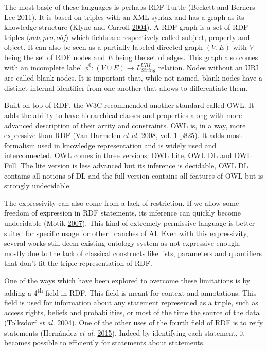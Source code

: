 \documentclass[11pt,a4paper,twoside,openright,titlepage,numbers=noenddot,headinclude,cleardoublepage=empty,openany]{scrreprt}
\theoremstyle{plain}
\theoremstyle{definition}
\theoremstyle{remark}
\begin{document}
The most basic of these languages is perhaps RDF Turtle (Beckett and
Berners-Lee \protect\hyperlink{ref-beckett_turtle_2011}{2011}). It is
based on triples with an XML syntax and has a graph as its knowledge
structure (Klyne and Carroll
\protect\hyperlink{ref-klyne_resource_2004}{2004}). A RDF graph is a set
of RDF triples \(\langle sub, pro, obj \rangle\) which fields are
respectively called subject, property and object. It can also be seen as
a partially labeled directed graph \((V, E)\) with \(V\) being the set
of RDF nodes and \(E\) being the set of edges. This graph also comes
with an incomplete label \(\phi^0 : (V \cup E) \to L_{String}^{URI}\)
relation. Nodes without an URI are called blank nodes. It is important
that, while not named, blank nodes have a distinct internal identifier
from one another that allows to differentiate them.

Built on top of RDF, the W3C recommended another standard called OWL. It
adds the ability to have hierarchical classes and properties along with
more advanced description of their arrity and constraints. OWL is, in a
way, more expressive than RDF (Van Harmelen \emph{et al.}
\protect\hyperlink{ref-vanharmelen_handbook_2008}{2008}, vol. 1 p825).
It adds most formalism used in knowledge representation and is widely
used and interconnected. OWL comes in three versions: OWL Lite, OWL DL
and OWL Full. The lite version is less advanced but its inference is
decidable, OWL DL contains all notions of DL and the full version
contains all features of OWL but is strongly undecidable.

The expressivity can also come from a lack of restriction. If we allow
some freedom of expression in RDF statements, its inference can quickly
become undecidable (Motik
\protect\hyperlink{ref-motik_properties_2007}{2007}). This kind of
extremely permissive language is better suited for specific usage for
other branches of AI. Even with this expressivity, several works still
deem existing ontology system as not expressive enough, mostly due to
the lack of classical constructs like lists, parameters and quantifiers
that don't fit the triple representation of RDF.

One of the ways which have been explored to overcome these limitations
is by adding a 4\textsuperscript{th} field in RDF. This field is meant
for context and annotations. This field is used for information about
any statement represented as a triple, such as access rights, beliefs
and probabilities, or most of the time the source of the data (Tolksdorf
\emph{et al.} \protect\hyperlink{ref-tolksdorf_semantic_2004}{2004}).
One of the other uses of the fourth field of RDF is to reify statements
(Hernández \emph{et al.}
\protect\hyperlink{ref-hernandez_reifying_2015}{2015}). Indeed by
identifying each statement, it becomes possible to efficiently for
statements about statements.
\end{document}
